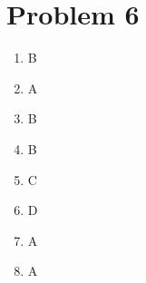 \documentclass{article}
\begin{document}
\section*{Problem 6}
\begin{enumerate}
\item B \\
\item A \\
\item B \\
\item B \\
\item C \\
\item D \\
\item A \\
\item A
\end{enumerate}
\end{document}
